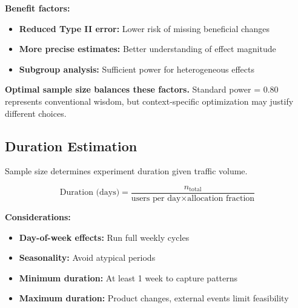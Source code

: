 \textbf{Benefit factors:}
\begin{itemize}
    \item \textbf{Reduced Type II error:} Lower risk of missing beneficial changes
    \item \textbf{More precise estimates:} Better understanding of effect magnitude
    \item \textbf{Subgroup analysis:} Sufficient power for heterogeneous effects
\end{itemize}

\textbf{Optimal sample size balances these factors.} Standard power = 0.80 represents conventional wisdom, but context-specific optimization may justify different choices.

\subsection{Duration Estimation}

Sample size determines experiment duration given traffic volume.

\begin{equation}
\text{Duration (days)} = \frac{n_{\text{total}}}{\text{users per day} \times \text{allocation fraction}}
\end{equation}

\textbf{Considerations:}
\begin{itemize}
    \item \textbf{Day-of-week effects:} Run full weekly cycles
    \item \textbf{Seasonality:} Avoid atypical periods
    \item \textbf{Minimum duration:} At least 1 week to capture patterns
    \item \textbf{Maximum duration:} Product changes, external events limit feasibility
\end{itemize}

